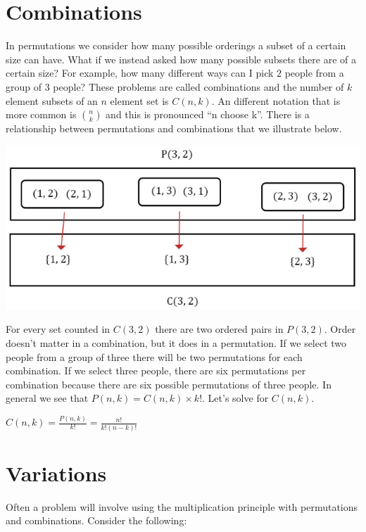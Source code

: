 \documentclass[
]{book}
\theoremstyle{definition}
\theoremstyle{definition}
\theoremstyle{definition}
\theoremstyle{remark}
\begin{document}
\hypertarget{combinations}{%
\section{Combinations}\label{combinations}}

In permutations we consider how many possible orderings a subset of a certain size can have. What if we instead asked how many possible subsets there are of a certain size? For example, how many different ways can I pick \(2\) people from a group of \(3\) people? These problems are called combinations and the number of \(k\) element subsets of an \(n\) element set is \(C(n,k)\). An different notation that is more common is \(n \choose k\) and this is pronounced ``n choose k''. There is a relationship between permutations and combinations that we illustrate below.

\includegraphics{Pictures/02-Counting/P(3,2)vsC(3,2).PNG}

For every set counted in \(C(3,2)\) there are two ordered pairs in \(P(3,2)\). Order doesn't matter in a combination, but it does in a permutation. If we select two people from a group of three there will be two permutations for each combination. If we select three people, there are six permutations per combination because there are six possible permutations of three people. In general we see that \(P(n,k) = C(n,k)\times k!\). Let's solve for \(C(n,k)\).

\(C(n,k) = \frac{P(n,k)}{k!} = \frac{n!}{k!(n-k)!}\)

\hypertarget{variations}{%
\section{Variations}\label{variations}}

Often a problem will involve using the multiplication principle with permutations and combinations. Consider the following:
\end{document}

